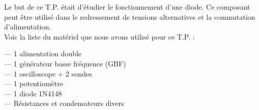 Le but de ce T.P. était d’étudier le fonctionnement d’une diode. Ce composant peut être utilisé dans le redressement de tensions alternatives et la commutation d’alimentation.
\\

Voic la liste du matériel que nous avons utilisé pour ce T.P. :

— 1 alimentation double \\
— 1 générateur basse fréquence (GBF)\\
— 1 oscilloscope + 2 sondes\\
— 1 potentiomètre\\
— 1 diode 1N4148\\
— Résistances et condensateurs divers